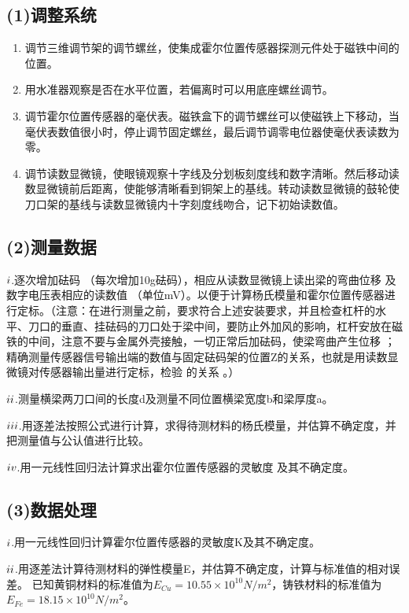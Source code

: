 \documentclass[11pt,a4paper,oneside]{article}
\begin{document}
\subsection*{(1)调整系统}
\begin{enumerate}
\item 调节三维调节架的调节螺丝，使集成霍尔位置传感器探测元件处于磁铁中间的位置。
\item 用水准器观察是否在水平位置，若偏离时可以用底座螺丝调节。
\item 调节霍尔位置传感器的毫伏表。磁铁盒下的调节螺丝可以使磁铁上下移动，当毫伏表数值很小时，停止调节固定螺丝，最后调节调零电位器使毫伏表读数为零。
\item 调节读数显微镜，使眼镜观察十字线及分划板刻度线和数字清晰。然后移动读数显微镜前后距离，使能够清晰看到铜架上的基线。转动读数显微镜的鼓轮使刀口架的基线与读数显微镜内十字刻度线吻合，记下初始读数值。
\end{enumerate} 	
\subsection*{(2)测量数据 }
${\romannumeral1}$.逐次增加砝码 （每次增加10g砝码），相应从读数显微镜上读出梁的弯曲位移  及数字电压表相应的读数值 （单位mV）。以便于计算杨氏模量和霍尔位置传感器进行定标。（注意：在进行测量之前，要求符合上述安装要求，并且检查杠杆的水平、刀口的垂直、挂砝码的刀口处于梁中间，要防止外加风的影响，杠杆安放在磁铁的中间，注意不要与金属外壳接触，一切正常后加砝码，使梁弯曲产生位移  ；精确测量传感器信号输出端的数值与固定砝码架的位置Z的关系，也就是用读数显微镜对传感器输出量进行定标，检验  的关系 。）

${\romannumeral2}$.测量横梁两刀口间的长度d及测量不同位置横梁宽度b和梁厚度a。

${\romannumeral3}$.用逐差法按照公式进行计算，求得待测材料的杨氏模量，并估算不确定度，并把测量值与公认值进行比较。

${\romannumeral4}$.用一元线性回归法计算求出霍尔位置传感器的灵敏度 及其不确定度。
\subsection*{(3)数据处理}
${\romannumeral1}$.用一元线性回归计算霍尔位置传感器的灵敏度K及其不确定度。

${\romannumeral2}$.用逐差法计算待测材料的弹性模量E，并估算不确定度，计算与标准值的相对误差。
已知黄铜材料的标准值为$E_{Cu} = 10.55{\times
}10^10 N/{m^2}$，铸铁材料的标准值为$E_{Fe} = 18.15{\times
}10^10 N/{m^2}$。
\end{document}
